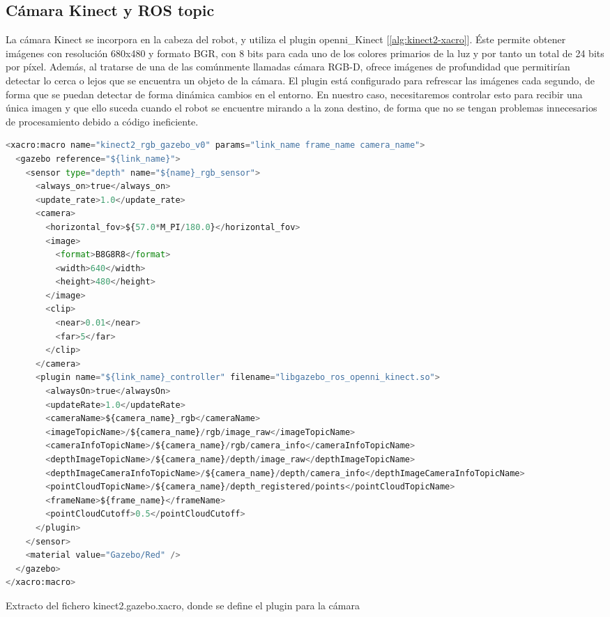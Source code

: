 \documentclass[12pt,spanish,chapterprefix, numbers=noenddot]{book}
\numberwithin{equation}{section}
\numberwithin{figure}{section}
\begin{document}
\subsection{Cámara Kinect y ROS topic} 
La cámara Kinect se incorpora en la cabeza del robot, y utiliza el plugin openni\_Kinect [\ref{alg:kinect2-xacro}]. Éste permite obtener imágenes con resolución 680x480 y formato BGR, con 8 bits para cada uno de los colores primarios de la luz y por tanto un total de 24 bits por píxel. Además, al tratarse de una de las comúnmente llamadas cámara RGB-D, ofrece imágenes de profundidad que permitirían detectar lo cerca o lejos que se encuentra un objeto de la cámara. El plugin está configurado para refrescar las imágenes cada segundo, de forma que se puedan detectar de forma dinámica cambios en el entorno.
En nuestro caso, necesitaremos controlar esto para recibir una única imagen y que ello suceda cuando el robot se encuentre mirando a la zona destino, de forma que no se tengan problemas innecesarios de procesamiento debido a código ineficiente.

\vspace{20pt}
\begin{algorithm}[h!]
	\begin{lstlisting}[breaklines=true,language=python]    
<xacro:macro name="kinect2_rgb_gazebo_v0" params="link_name frame_name camera_name">
  <gazebo reference="${link_name}">
    <sensor type="depth" name="${name}_rgb_sensor">
      <always_on>true</always_on>
      <update_rate>1.0</update_rate>
      <camera>
        <horizontal_fov>${57.0*M_PI/180.0}</horizontal_fov>
        <image>
          <format>B8G8R8</format>
          <width>640</width>
          <height>480</height>
        </image>
        <clip>
          <near>0.01</near>
          <far>5</far>
        </clip>
      </camera>
      <plugin name="${link_name}_controller" filename="libgazebo_ros_openni_kinect.so">
        <alwaysOn>true</alwaysOn>
        <updateRate>1.0</updateRate>
        <cameraName>${camera_name}_rgb</cameraName>
        <imageTopicName>/${camera_name}/rgb/image_raw</imageTopicName>
        <cameraInfoTopicName>/${camera_name}/rgb/camera_info</cameraInfoTopicName>
        <depthImageTopicName>/${camera_name}/depth/image_raw</depthImageTopicName>
        <depthImageCameraInfoTopicName>/${camera_name}/depth/camera_info</depthImageCameraInfoTopicName>
        <pointCloudTopicName>/${camera_name}/depth_registered/points</pointCloudTopicName>
        <frameName>${frame_name}</frameName>
        <pointCloudCutoff>0.5</pointCloudCutoff>
      </plugin>
    </sensor>
    <material value="Gazebo/Red" />
  </gazebo>
</xacro:macro>
	\end{lstlisting}
\caption{\label{alg:kinect2-xacro}Extracto del fichero kinect2.gazebo.xacro, donde se define el plugin para la cámara}
\end{algorithm}
\end{document}
